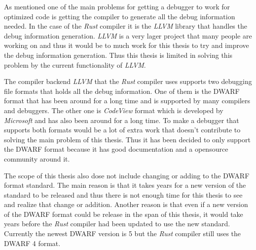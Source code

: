 




As mentioned one of the main problems for getting a debugger to work for optimized code is getting the compiler to generate all the debug information needed.
In the case of the \emph{Rust} compiler it is the \emph{LLVM} library that handles the debug information generation.
\emph{LLVM} is a very lager project that many people are working on and thus it would be to much work for this thesis to try and improve the debug information generation.
Thus this thesis is limited in solving this problem by the current functionality of \emph{LLVM}.


The compiler backend \emph{LLVM} that the \emph{Rust} compiler uses supports two debugging file formats that holds all the debug information.
One of them is the \gls{DWARF} format that has been around for a long time and is supported by many compilers and debuggers.
The other one is \emph{CodeView} format which is developed by \emph{Microsoft} and has also been around for a long time.
To make a debugger that supports both formats would be a lot of extra work that doesn't contribute to solving the main problem of this thesis.
Thus it has been decided to only support the \gls{DWARF} format because it has good documentation and a opensource community around it.


The scope of this thesis also dose not include changing or adding to the \gls{DWARF} format standard.
The main reason is that it takes years for a new version of the standard to be released and thus there is not enough time for this thesis to see and realize that change or addition.
Another reason is that even if a new version of the \gls{DWARF} format could be release in the span of this thesis, it would take years before the \emph{Rust} compiler had been updated to use the new standard.
Currently the newest \gls{DWARF} version is 5 but the \emph{Rust} compiler still uses the \gls{DWARF} 4 format.


